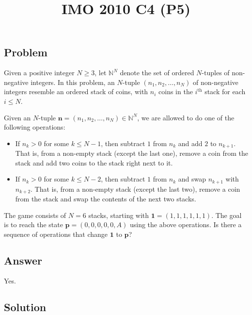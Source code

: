 \documentclass{article}
\title{IMO 2010 C4 (P5)}
\author{}
\date{}
\newcommand{\N}{\mathbb{N}}
\begin{document}
\maketitle



\subsection*{Problem}

Given a positive integer $N \geq 3$, let $\N^N$ denote the set of ordered $N$-tuples of non-negative integers.
In this problem, an $N$-tuple $(n_1, n_2, \ldots, n_N)$ of non-negative integers resemble an ordered stack of coins, with $n_i$ coins in the $i^{\text{th}}$ stack for each $i \leq N$.

Given an $N$-tuple $\mathbf{n} = (n_1, n_2, \ldots, n_N) \in \N^N$, we are allowed to do one of the following operations:
\begin{itemize}

    \item
    If $n_k > 0$ for some $k \leq N - 1$, then subtract $1$ from $n_k$ and add $2$ to $n_{k + 1}$.
    That is, from a non-empty stack (except the last one), remove a coin from the stack and add two coins to the stack right next to it.

    \item
    If $n_k > 0$ for some $k \leq N - 2$, then subtract $1$ from $n_k$ and swap $n_{k + 1}$ with $n_{k + 2}$.
    That is, from a non-empty stack (except the last two), remove a coin from the stack and swap the contents of the next two stacks.


\end{itemize}

The game consists of $N = 6$ stacks, starting with $\mathbf{1} = (1, 1, 1, 1, 1, 1)$.
The goal is to reach the state $\mathbf{p} = (0, 0, 0, 0, 0, A)$ using the above operations.
Is there a sequence of operations that change $\mathbf{1}$ to $\mathbf{p}$?



\subsection*{Answer}

Yes.



\subsection*{Solution}
\end{document}
